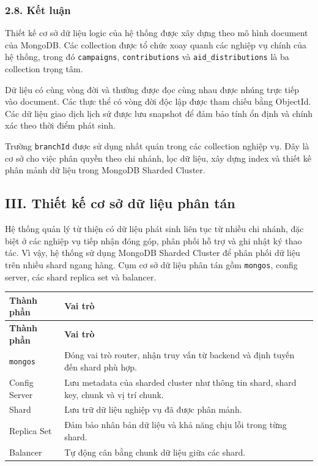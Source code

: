\documentclass[12pt,a4paper]{article}
\begin{document}
\subsubsection*{2.8. Kết luận}

Thiết kế cơ sở dữ liệu logic của hệ thống được xây dựng theo mô hình document của MongoDB. Các collection được tổ chức xoay quanh các nghiệp vụ chính của hệ thống, trong đó \texttt{campaigns}, \texttt{contributions} và \texttt{aid\_distributions} là ba collection trọng tâm.

Dữ liệu có cùng vòng đời và thường được đọc cùng nhau được nhúng trực tiếp vào document. Các thực thể có vòng đời độc lập được tham chiếu bằng ObjectId. Các dữ liệu giao dịch lịch sử được lưu snapshot để đảm bảo tính ổn định và chính xác theo thời điểm phát sinh.

Trường \texttt{branchId} được sử dụng nhất quán trong các collection nghiệp vụ. Đây là cơ sở cho việc phân quyền theo chi nhánh, lọc dữ liệu, xây dựng index và thiết kế phân mảnh dữ liệu trong MongoDB Sharded Cluster.



\subsection*{III. Thiết kế cơ sở dữ liệu phân tán}

Hệ thống quản lý từ thiện có dữ liệu phát sinh liên tục từ nhiều chi nhánh, đặc biệt ở các nghiệp vụ tiếp nhận đóng góp, phân phối hỗ trợ và ghi nhật ký thao tác. Vì vậy, hệ thống sử dụng MongoDB Sharded Cluster để phân phối dữ liệu trên nhiều shard ngang hàng. Cụm cơ sở dữ liệu phân tán gồm \texttt{mongos}, config server, các shard replica set và balancer.

\begin{center}
\small
\begin{longtable}{|p{3.2cm}|p{9.3cm}|}
\hline
\textbf{Thành phần} & \textbf{Vai trò} \\ \hline
\endfirsthead
\hline
\textbf{Thành phần} & \textbf{Vai trò} \\ \hline
\endhead
\texttt{mongos} & Đóng vai trò router, nhận truy vấn từ backend và định tuyến đến shard phù hợp. \\ \hline
Config Server & Lưu metadata của sharded cluster như thông tin shard, shard key, chunk và vị trí chunk. \\ \hline
Shard & Lưu trữ dữ liệu nghiệp vụ đã được phân mảnh. \\ \hline
Replica Set & Đảm bảo nhân bản dữ liệu và khả năng chịu lỗi trong từng shard. \\ \hline
Balancer & Tự động cân bằng chunk dữ liệu giữa các shard. \\ \hline
\end{longtable}
\normalsize
\end{center}
\end{document}
